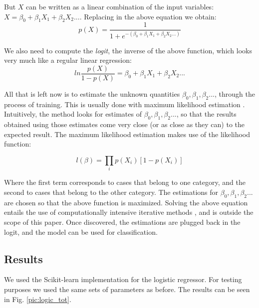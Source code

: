 But $X$ can be written as a linear combination of the input variables: $X = \beta_0 + \beta_1X_1 + \beta_2X_2 ... $. Replacing in the above equation we obtain:
\begin{equation*}
p(X) = \frac{1}{1+e^{-(\beta_0 + \beta_1X_1 + \beta_2X_2 ...)}}
\end{equation*}

We also need to compute the \textit{logit}, the inverse of the above function, which looks very much like a regular linear regression:
\begin{equation*}
ln\frac{p(X)}{1 - p(X)} = \beta_0 + \beta_1X_1 + \beta_2X_2 ...
\end{equation*}

All that is left now is to estimate the unknown quantities $\beta_0, \beta_1, \beta_2...$, through the process of training. This is usually done with maximum likelihood estimation \cite{menard2009logistic}. Intuitively, the method looks for estimates of $\beta_0, \beta_1, \beta_2...$, so that the results obtained using those estimates come very close (or as close as they can) to the expected result. The maximum likelihood estimation makes use of the likelihood function:

\begin{equation*}
l(\beta) = \prod_ip(X_i)[1 - p(X_i)]
\end{equation*}
 
Where the first term corresponds to cases that belong to one category, and the second to cases that belong to the other category. The estimations for $\beta_0, \beta_1, \beta_2...$ are chosen so that the above function is maximized. Solving the above equation entails the use of computationally intensive iterative methods \cite{logmodel}, and is outside the scope of this paper. Once discovered, the estimations are plugged back in the logit, and the model can be used for classification.
 
\subsection{Results}

We used the Scikit-learn \cite{scikit-learn} implementation for the logistic regressor. For testing purposes we used the same sets of parameters as before. The results can be seen in Fig. \ref{pic:logic_tot}.

